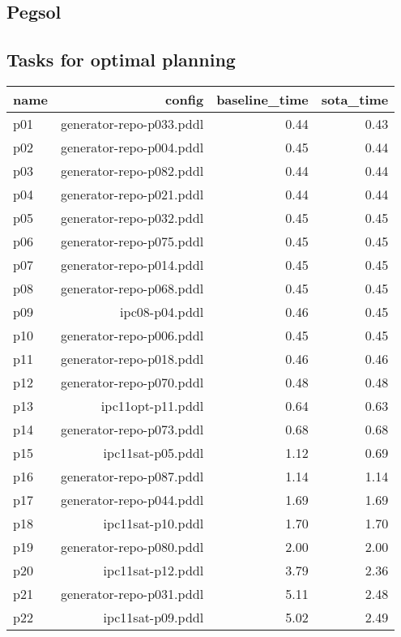 \documentclass{article}
\begin{document}
                \newpage \subsection{Pegsol}
                    \subsection*{Tasks for optimal planning}
                    
                            \begin{center}
                            \scriptsize
                            \begin{tabular}{@{}l|r|r|r@{}}
                            name & config & baseline\_time & sota\_time\\\midrule
                              p01& generator-repo-p033.pddl&0.44&0.43\\
  p02& generator-repo-p004.pddl&0.45&0.44\\
  p03& generator-repo-p082.pddl&0.44&0.44\\
  p04& generator-repo-p021.pddl&0.44&0.44\\
  p05& generator-repo-p032.pddl&0.45&0.45\\
  p06& generator-repo-p075.pddl&0.45&0.45\\
  p07& generator-repo-p014.pddl&0.45&0.45\\
  p08& generator-repo-p068.pddl&0.45&0.45\\
  p09& ipc08-p04.pddl&0.46&0.45\\
  p10& generator-repo-p006.pddl&0.45&0.45\\
  p11& generator-repo-p018.pddl&0.46&0.46\\
  p12& generator-repo-p070.pddl&0.48&0.48\\
  p13& ipc11opt-p11.pddl&0.64&0.63\\
  p14& generator-repo-p073.pddl&0.68&0.68\\
  p15& ipc11sat-p05.pddl&1.12&0.69\\
  p16& generator-repo-p087.pddl&1.14&1.14\\
  p17& generator-repo-p044.pddl&1.69&1.69\\
  p18& ipc11sat-p10.pddl&1.70&1.70\\
  p19& generator-repo-p080.pddl&2.00&2.00\\
  p20& ipc11sat-p12.pddl&3.79&2.36\\
  p21& generator-repo-p031.pddl&5.11&2.48\\
  p22& ipc11sat-p09.pddl&5.02&2.49\\

\end{tabular}
\end{center}
\end{document}
